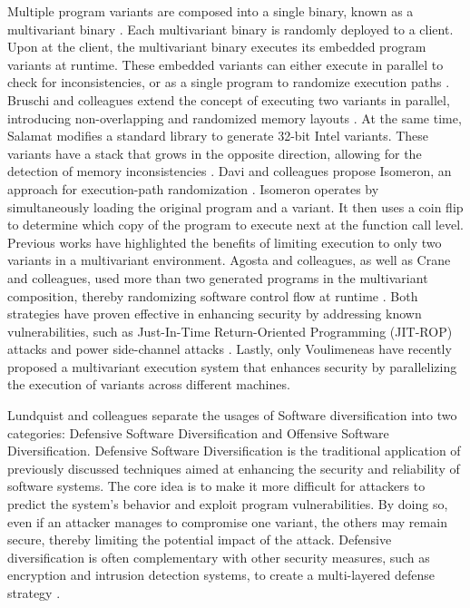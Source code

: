 Multiple program variants are composed into a single binary, known as a multivariant binary \cite{cox06}. 
Each multivariant binary is randomly deployed to a client.
Upon at the client, the multivariant binary executes its embedded program variants at runtime. 
These embedded variants can either execute in parallel to check for inconsistencies, or as a single program to randomize execution paths \cite{bhatkar03}. 
Bruschi and colleagues extend the concept of executing two variants in parallel, introducing non-overlapping and randomized memory layouts \cite{bruschi2007diversified}. 
At the same time, Salamat \etal modifies a standard library to generate 32-bit Intel variants. 
These variants have a stack that grows in the opposite direction, allowing for the detection of memory inconsistencies \cite{salamat2007stopping}. 
Davi and colleagues propose Isomeron, an approach for execution-path randomization \cite{davi2015isomeron}. 
Isomeron operates by simultaneously loading the original program and a variant. 
It then uses a coin flip to determine which copy of the program to execute next at the function call level. 
Previous works have highlighted the benefits of limiting execution to only two variants in a multivariant environment. 
Agosta and colleagues, as well as Crane and colleagues, used more than two generated programs in the multivariant composition, thereby randomizing software control flow at runtime \cite{agosta2015meet, crane2015thwarting}. 
Both strategies have proven effective in enhancing security by addressing known vulnerabilities, such as Just-In-Time Return-Oriented Programming (JIT-ROP) attacks \cite{jackson2011compiler} and power side-channel attacks \cite{amarilli2011can}. 
Lastly, only Voulimeneas \etal \cite{voulimeneas2021dmvx} have recently proposed a multivariant execution system that enhances security by parallelizing the execution of variants across different machines.

Lundquist and colleagues \cite{offensive_div} separate the usages of Software diversification into two categories: Defensive Software Diversification and Offensive Software Diversification.
Defensive Software Diversification is the traditional application of previously discussed techniques aimed at enhancing the security and reliability of software systems.
The core idea is to make it more difficult for attackers to predict the system's behavior and exploit program vulnerabilities. 
By doing so, even if an attacker manages to compromise one variant, the others may remain secure, thereby limiting the potential impact of the attack.
Defensive diversification is often complementary with other security measures, such as encryption and intrusion detection systems, to create a multi-layered defense strategy \cite{cryptography4020013}. 

